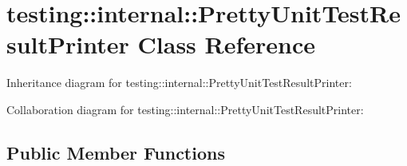 \hypertarget{classtesting_1_1internal_1_1PrettyUnitTestResultPrinter}{}\section{testing\+:\+:internal\+:\+:Pretty\+Unit\+Test\+Result\+Printer Class Reference}
\label{classtesting_1_1internal_1_1PrettyUnitTestResultPrinter}


Inheritance diagram for testing\+:\+:internal\+:\+:Pretty\+Unit\+Test\+Result\+Printer\+:


Collaboration diagram for testing\+:\+:internal\+:\+:Pretty\+Unit\+Test\+Result\+Printer\+:
\subsection*{Public Member Functions}
